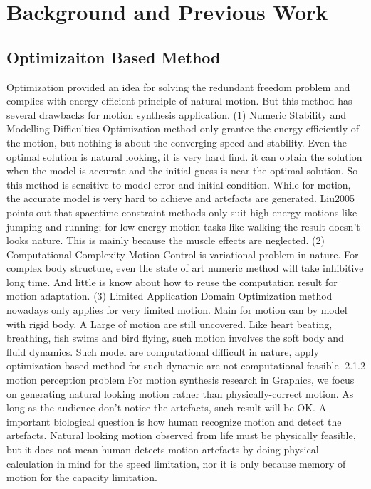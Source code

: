 \section{Background and Previous Work}
\subsection{Optimizaiton Based Method}
Optimization provided an idea for solving the redundant freedom problem and complies with energy efficient principle of natural motion.  But this method has several drawbacks for motion synthesis application.
(1) Numeric Stability and Modelling Difficulties
Optimization method only grantee the energy efficiently of the motion, but nothing is about the converging speed and stability. Even the optimal solution is natural looking, it is very hard find.
it can obtain the solution when the model is accurate and the initial guess is near the optimal solution.
So this method is sensitive to model error and initial condition. 
While for motion, the accurate model is very hard to achieve and artefacts are generated.
Liu2005  points out that spacetime constraint methods only suit high energy motions like jumping and running; for low energy motion tasks like walking the result doesn't looks nature. This is mainly because the muscle effects are neglected.
(2) Computational Complexity
Motion Control is variational problem in nature. For complex body structure, even the state of art numeric method will take inhibitive long time. And little is know about how to reuse the computation result for motion adaptation.
(3) Limited Application Domain
Optimization method nowadays only applies for very limited motion. Main for motion can by model with rigid body.
 A Large of motion are still uncovered. Like heart beating, breathing, fish swims and bird flying, such motion involves the soft body and fluid dynamics. Such model are computational difficult in nature, apply optimization based method for such dynamic are not computational feasible.
2.1.2 motion perception problem
For motion synthesis research in Graphics, we focus on generating natural looking motion rather than physically-correct motion. As long as the audience don’t notice the artefacts, such result will be OK. A important biological question is how human recognize motion and detect the artefacts. Natural looking motion observed from life must be physically feasible, but it does not mean human detects motion artefacts by doing physical calculation in mind for the speed limitation, nor it is only because memory of motion for the capacity limitation.
